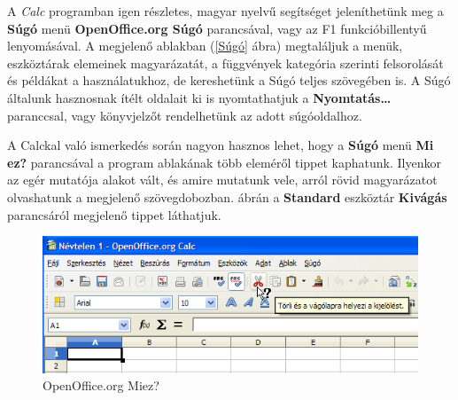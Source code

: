 A \textit{Calc} programban igen részletes, magyar nyelvű
segítséget jeleníthetünk meg a \textbf{Súgó} menü
\textbf{OpenOffice.org Súgó} parancsával, vagy az F1
funkcióbillentyű lenyomásával. A megjelenő ablakban (\ref{Súgó}
ábra) megtaláljuk a menük, eszköztárak elemeinek
magyarázatát, a függvények kategória szerinti
felsorolását és példákat a használatukhoz, de kereshetünk
a Súgó teljes szövegében is.
A Súgó általunk hasznosnak ítélt oldalait ki is nyomtathatjuk
a \textbf{Nyomtatás\dots} paranccsal,  vagy könyvjelzőt
rendelhetünk az adott súgóoldalhoz.

A Calckal való ismerkedés során nagyon hasznos lehet, hogy a
\textbf{Súgó} menü \textbf{Mi ez?} parancsával a program
ablakának több eleméről tippet kaphatunk. Ilyenkor az egér
mutatója alakot vált, és amire mutatunk vele, arról rövid
magyarázatot olvashatunk a megjelenő szövegdobozban. 
ábrán a \textbf{Standard} eszköztár \textbf{Kivágás}
parancsáról megjelenő tippet láthatjuk.
\begin{figure}[!h]
\begin{center}
\includegraphics[width=14.736cm]{oocalcv1-img4.png}
\caption{OpenOffice.org Miez?}\label{Miez}
\end{center}
\end{figure}
